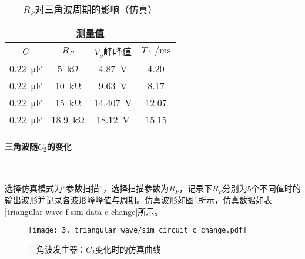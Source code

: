 \documentclass[UTF8]{ctexart}
\numberwithin{figure}{subsection}
\numberwithin{table}{subsection}
\numberwithin{equation}{subsection}
\begin{document}
\begin{table}[h]
    \begin{center}
        \caption{\(R_P\)对三角波周期的影响（仿真）}
        \begin{tabular}{|c|c|c|c|}
            \hline
            \multicolumn{4}{|c|}{测量值} \\
            \hline
            \(C\) & \(R_P\) & \(V_o\)峰峰值 & \(T\cdot\SI{}{\per\milli\second}\)\\
            \hline
            \SI{0.22}{\micro\farad} & \SI{5}{\kilo\ohm} & \SI{4.87}{\volt} & 4.20 \\
            \hline
            \SI{0.22}{\micro\farad} & \SI{10}{\kilo\ohm} & \SI{9.63}{\volt} & 8.17 \\
            \hline
            \SI{0.22}{\micro\farad} & \SI{15}{\kilo\ohm} & \SI{14.407}{\volt} & 12.07 \\
            \hline
            \SI{0.22}{\micro\farad} & \SI{18.9}{\kilo\ohm} & \SI{18.12}{\volt} & 15.15 \\
            \hline
        \end{tabular}
    \end{center}
    \label{triangular wave f sim data r change}
\end{table}


\paragraph{三角波随\(C_2\)的变化}~{}
\par 选择仿真模式为“参数扫描”，选择扫描参数为\(R_P\)，记录下\(R_P\)分别为5个不同值时的输出波形并记录各波形峰峰值与周期。仿真波形如图\ref{triangular sim curve c change}所示，仿真数据如表\ref{triangular wave f sim data c change}所示。

\begin{figure}[H]
    \begin{center}
        \caption{三角波发生器：\(C_2\)变化时的仿真曲线}
        \texttt{[image: 3. triangular wave/sim circuit c change.pdf]}
        \label{triangular sim curve c change}
    \end{center}
\end{figure}
\end{document}
